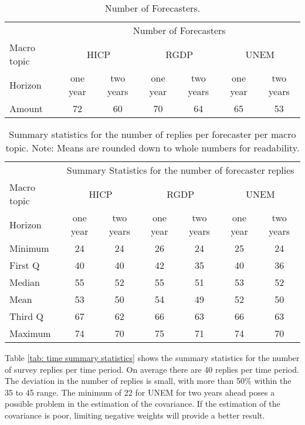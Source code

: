 \documentclass[11pt]{article}
\begin{document}
	\begin{table}[!h]
		\centering
		\caption{Number of Forecasters.}
		\label{tab: amount of forecasters}
		\begin{tabular}{lcccccc}
			\hline
			&\multicolumn{6}{c}{Number of Forecasters}\\
			\cmidrule(lr){2-7}
			Macro topic & \multicolumn{2}{c}{HICP} & \multicolumn{2}{c}{RGDP} & \multicolumn{2}{c}{UNEM} \\
			\cmidrule(lr){2-3} \cmidrule(lr){4-5}\cmidrule(lr){6-7}
			Horizon     & one year & two years & one year & two years & one year & two years \\ 
			\hline
			Amount        &      72   &60          &70         &64         & 65         & 53       \\
			\hline
		\end{tabular}
	\end{table}
	
	\begin{table}[!h]
		\centering
		\caption{Summary statistics for the number of replies per forecaster per macro topic. Note: Means are rounded down to whole numbers for readability.}
		\label{tab: forecaster summary statistics}
		\begin{tabular}{lcccccc}%
			\hline
			&\multicolumn{6}{c}{Summary Statistics for the number of forecaster replies}\\
			\cmidrule(lr){2-7}
			Macro topic & \multicolumn{2}{c}{HICP} & \multicolumn{2}{c}{RGDP} & \multicolumn{2}{c}{UNEM} \\
			\cmidrule(lr){2-3} \cmidrule(lr){4-5}\cmidrule(lr){6-7}
			Horizon     & one year & two years & one year & two years & one year & two years \\ 
			\hline
			Minimum & 24    & 24    & 26    & 24    & 25    & 24    \\
			First Q & 40    & 40    & 42    & 35    & 40    & 36    \\
			Median  & 55    & 52    & 55    & 51    & 53    & 52    \\
			Mean    & 53    & 50    & 54    & 49    & 52    & 50    \\
			Third Q & 67    & 62    & 66    & 63    & 66    & 63    \\
			Maximum & 74    & 70    & 75    & 71    & 74    & 70      \\ 
			\hline
		\end{tabular}
	\end{table}
	
	Table \ref{tab: time summary statistics} shows the summary statistics for the number of survey replies per time period. On average there are 40 replies per time period. The deviation in the number of replies is small, with more than 50\% within the 35 to 45 range. The minimum of 22 for UNEM for two years ahead poses a possible problem in the estimation of the covariance. If the estimation of the covariance is poor, limiting negative weights will provide a better result.
	
\end{document}
